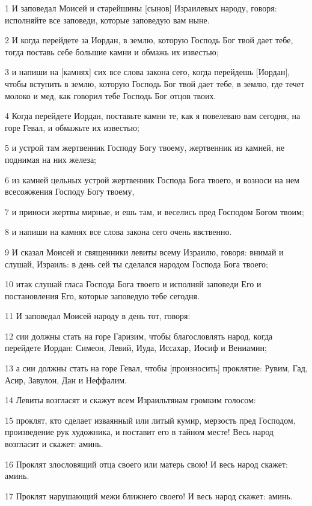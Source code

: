 \par 1 И заповедал Моисей и старейшины [сынов] Израилевых народу, говоря: исполняйте все заповеди, которые заповедую вам ныне.
\par 2 И когда перейдете за Иордан, в землю, которую Господь Бог твой дает тебе, тогда поставь себе большие камни и обмажь их известью;
\par 3 и напиши на [камнях] сих все слова закона сего, когда перейдешь [Иордан], чтобы вступить в землю, которую Господь Бог твой дает тебе, в землю, где течет молоко и мед, как говорил тебе Господь Бог отцов твоих.
\par 4 Когда перейдете Иордан, поставьте камни те, как я повелеваю вам сегодня, на горе Гевал, и обмажьте их известью;
\par 5 и устрой там жертвенник Господу Богу твоему, жертвенник из камней, не поднимая на них железа;
\par 6 из камней цельных устрой жертвенник Господа Бога твоего, и возноси на нем всесожжения Господу Богу твоему,
\par 7 и приноси жертвы мирные, и ешь там, и веселись пред Господом Богом твоим;
\par 8 и напиши на камнях все слова закона сего очень явственно.
\par 9 И сказал Моисей и священники левиты всему Израилю, говоря: внимай и слушай, Израиль: в день сей ты сделался народом Господа Бога твоего;
\par 10 итак слушай гласа Господа Бога твоего и исполняй заповеди Его и постановления Его, которые заповедую тебе сегодня.
\par 11 И заповедал Моисей народу в день тот, говоря:
\par 12 сии должны стать на горе Гаризим, чтобы благословлять народ, когда перейдете Иордан: Симеон, Левий, Иуда, Иссахар, Иосиф и Вениамин;
\par 13 а сии должны стать на горе Гевал, чтобы [произносить] проклятие: Рувим, Гад, Асир, Завулон, Дан и Неффалим.
\par 14 Левиты возгласят и скажут всем Израильтянам громким голосом:
\par 15 проклят, кто сделает изваянный или литый кумир, мерзость пред Господом, произведение рук художника, и поставит его в тайном месте! Весь народ возгласит и скажет: аминь.
\par 16 Проклят злословящий отца своего или матерь свою! И весь народ скажет: аминь.
\par 17 Проклят нарушающий межи ближнего своего! И весь народ скажет: аминь.
